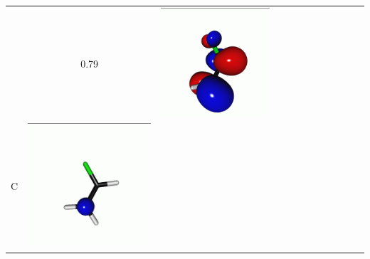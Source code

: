 \documentclass[journal=jctcce,manuscript=article]{achemso}
\begin{document}
\begin{table}[H]
\begin{tabular}{c|ccc|cccc|cccc}
\begin{minipage}{0.2\textwidth}
     \end{minipage}
     & 0.79
     &  \begin{minipage}{0.2\textwidth}
         \centering
         \includegraphics[scale=0.10]{NTO/CH2CHF/2p.png}
     \end{minipage}
     \\
             C &  
     \begin{minipage}{0.2\textwidth}
         \centering
         \includegraphics[scale=0.10]{NTO/CH2CHF/4h.png}

\end{minipage}
\end{tabular}
\end{table}
\end{document}
